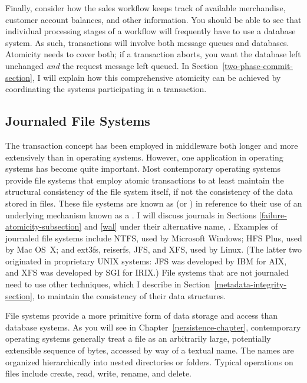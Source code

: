 Finally, consider how the sales workflow keeps track of available
merchandise, customer account balances, and other information.  You
should be able to see that individual processing stages of a workflow
will frequently have to use a database system.  As such, transactions
will involve both message queues and databases.  Atomicity needs to
cover both; if a transaction aborts, you want the database left
unchanged \emph{and} the request message left queued.  In
Section~\ref{two-phase-commit-section}, I will explain how this
comprehensive atomicity can be achieved by coordinating the systems
participating in a transaction.

\subsection{Journaled File Systems}\label{jfs-transactions-section}

The transaction concept has been employed in middleware both longer
and more extensively than in operating systems.  However, one
application in operating systems has become quite important.  Most
contemporary operating systems provide file systems that employ atomic
transactions to at least maintain the structural consistency of the
file system itself, if not the consistency of the data stored in
files.  These file systems are known as
 (or
) in reference to their use of an
underlying mechanism known as a . I will discuss
journals in Sections \ref{failure-atomicity-subsection} and \ref{wal} under their alternative name,
.  Examples of journaled file systems include NTFS, used
by Microsoft Windows; HFS Plus, used by Mac OS~X; and ext3fs, reiserfs, JFS, and XFS, used by Linux.  (The latter two
originated in proprietary UNIX systems: JFS was developed by IBM for
AIX, and XFS was developed by SGI for IRIX.)  File systems that are
not journaled need to use other techniques, which I describe in
Section~\ref{metadata-integrity-section}, to maintain the consistency of
their data structures.

File systems provide a more primitive form of data storage and access
than database systems.  As you will see in Chapter~\ref{persistence-chapter}, contemporary
operating systems generally treat a file as an arbitrarily large,
potentially extensible sequence of bytes, accessed by way of a
textual name.  The names are organized hierarchically into nested
directories or folders.  Typical operations on files include create,
read, write, rename, and delete.

